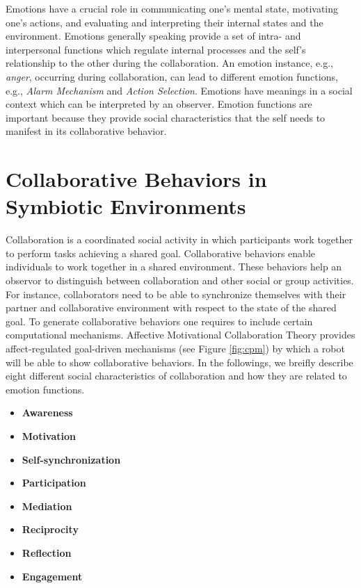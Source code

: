 \documentclass[letterpaper]{article}
\begin{document}
Emotions have a crucial role in communicating one's mental state, motivating
one's actions, and evaluating and interpreting their internal states and the
environment. Emotions generally speaking provide a set of intra- and
interpersonal functions which regulate internal processes and the self's
relationship to the other during the collaboration. An emotion instance, e.g.,
\textit{anger}, occurring during collaboration, can lead to different emotion
functions, e.g., \textit{Alarm Mechanism} and \textit{Action Selection}.
Emotions have meanings in a social context which can be interpreted by an
observer. Emotion functions are important because they provide social
characteristics that the self needs to manifest in its collaborative behavior. 

\section{Collaborative Behaviors in Symbiotic Environments}

Collaboration is a coordinated social activity in which participants work
together to perform tasks achieving a shared goal. Collaborative behaviors
enable individuals to work together in a shared environment. These behaviors
help an observor to distinguish between collaboration and other social or
group activities. For instance, collaborators need to be able to synchronize
themselves with their partner and collaborative environment with respect to the
state of the shared goal. To generate collaborative behaviors one requires to
include certain computational mechanisms. Affective Motivational Collaboration
Theory provides affect-regulated goal-driven mechanisms (see Figure
\ref{fig:cpm}) by which a robot will be able to show collaborative behaviors. In
the followings, we breifly describe eight different social characteristics of
collaboration and how they are related to emotion functions.

\begin{itemize}
  \item \textbf{Awareness}
  \item \textbf{Motivation}
  \item \textbf{Self-synchronization}
  \item \textbf{Participation}
  \item \textbf{Mediation}
  \item \textbf{Reciprocity}
  \item \textbf{Reflection}
  \item \textbf{Engagement}
\end{itemize}
\end{document}
